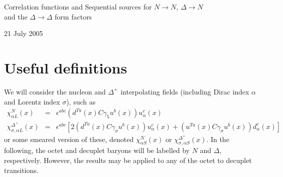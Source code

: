 \documentclass[12pt]{article}
\begin{document}
\begin{center}
\Large Correlation functions and Sequential sources for 
$N\rightarrow N$, $\Delta\rightarrow N$ \\
and the $\Delta\rightarrow\Delta$ 
form factors
\vspace{2mm}

21 July 2005
\end{center}

\section{Useful definitions}

We will consider the nucleon and $\Delta^+$ interpolating fields
(including Dirac index $\alpha$ and Lorentz index $\sigma$), such as
\begin{eqnarray*}
\chi^N_{\alpha L}(x) &=&
    \epsilon^{abc}\left(d^{Ta}(x)C\gamma_5u^b(x)\right)u_\alpha^c(x) \\
\chi^{\Delta^+}_{\sigma,\alpha L}(x) &=&
    \epsilon^{abc}\left[2\left(d^{Ta}(x)C\gamma_\sigma u^b(x)\right)u_\alpha^c(x)
                        +\left(u^{Ta}(x)C\gamma_\sigma u^b(x)\right)d_\alpha^c(x)\right]
\end{eqnarray*}
or some smeared version of these, denoted $\chi^N_{\alpha S}(x)$ or
$\chi^{\Delta^+}_{\sigma,\alpha S}(x)$.  In the following, the octet
and decuplet baryons will be labelled by $N$ and $\Delta$,
respectively.  However, the results may be applied to any of the octet
to decuplet transitions.
\end{document}
